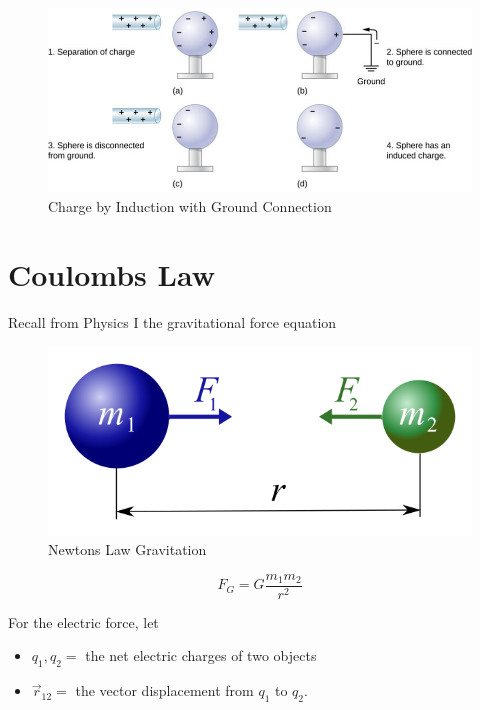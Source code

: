 \documentclass[14pt]{memoir}
\begin{document}
\begin{figure}[H]
\begin{center}
\includegraphics[scale=0.60]{fig/fig_05_13.jpg}
\caption{Charge by Induction with Ground Connection}
\label{fig:05_13}
\end{center}
\end{figure}

\section{Coulombs Law}

Recall from Physics I the gravitational force equation

\begin{figure}[h]
\begin{center}
\includegraphics[scale=0.60]{fig/NewtonsLawGravitation.png}
\caption{Newtons Law Gravitation}
\label{fig:NLG}
\end{center}
\end{figure}

\begin{equation}
F_G = G \frac{m_1 m_2}{r^{2}}
\end{equation}



For the electric force, let
\begin{itemize}
\item $q_1, q_2 = $ the net electric charges of two objects
\item $\vec{r}_{12} = $ the vector displacement from $q_1$ to $q_2$.
\end{itemize}
\end{document}
